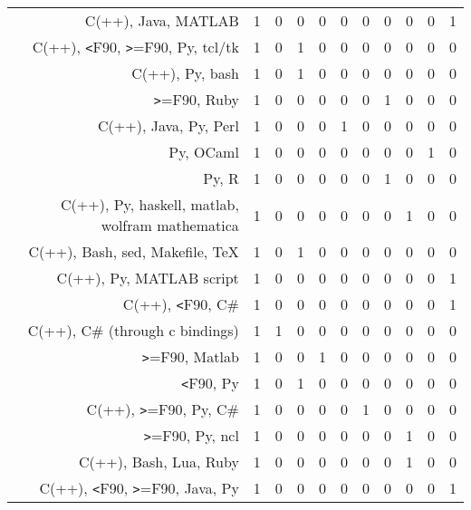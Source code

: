 {\begin{landscape}
\begin{longtable}[htb]{r|c|c|c|c|c|c|c|c|c|c}
{C(++), Java, MATLAB} & 1 & 0 & 0 & 0 & 0 & 0 & 0 & 0 & 0 & 1 \\%
{C(++), \verb!<!F90, \verb!>!=F90, Py, tcl/tk} & 1 & 0 & 1 & 0 & 0 & 0 & 0 & 0 & 0 & 0 \\%
{C(++), Py, bash} & 1 & 0 & 1 & 0 & 0 & 0 & 0 & 0 & 0 & 0 \\%
{\verb!>!=F90, Ruby} & 1 & 0 & 0 & 0 & 0 & 0 & 1 & 0 & 0 & 0 \\%
{C(++), Java, Py, Perl} & 1 & 0 & 0 & 0 & 1 & 0 & 0 & 0 & 0 & 0 \\%
{Py, OCaml} & 1 & 0 & 0 & 0 & 0 & 0 & 0 & 0 & 1 & 0 \\%
{Py, R} & 1 & 0 & 0 & 0 & 0 & 0 & 1 & 0 & 0 & 0 \\%
{C(++), Py, haskell, matlab, wolfram mathematica} & 1 & 0 & 0 & 0 & 0 & 0 & 0 & 1 & 0 & 0 \\%
{C(++), Bash, sed, Makefile, TeX} & 1 & 0 & 1 & 0 & 0 & 0 & 0 & 0 & 0 & 0 \\%
{C(++), Py, MATLAB script} & 1 & 0 & 0 & 0 & 0 & 0 & 0 & 0 & 0 & 1 \\%
{C(++), \verb!<!F90, C\#} & 1 & 0 & 0 & 0 & 0 & 0 & 0 & 0 & 0 & 1 \\%
{C(++), C\# (through c bindings)} & 1 & 1 & 0 & 0 & 0 & 0 & 0 & 0 & 0 & 0 \\%
{\verb!>!=F90, Matlab} & 1 & 0 & 0 & 1 & 0 & 0 & 0 & 0 & 0 & 0 \\%
{\verb!<!F90, Py} & 1 & 0 & 1 & 0 & 0 & 0 & 0 & 0 & 0 & 0 \\%
{C(++), \verb!>!=F90, Py, C\#} & 1 & 0 & 0 & 0 & 0 & 1 & 0 & 0 & 0 & 0 \\%
{\verb!>!=F90, Py, ncl} & 1 & 0 & 0 & 0 & 0 & 0 & 0 & 1 & 0 & 0 \\%
{C(++), Bash, Lua, Ruby} & 1 & 0 & 0 & 0 & 0 & 0 & 0 & 1 & 0 & 0 \\%
{C(++), \verb!<!F90, \verb!>!=F90, Java, Py} & 1 & 0 & 0 & 0 & 0 & 0 & 0 & 0 & 0 & 1 \\%
\hline%
\end{longtable}%
\end{landscape}}%
\clearpage%
